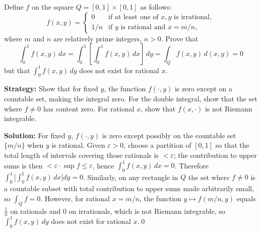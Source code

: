 \begin{problembox}
\begin{problemstatement}
Define \( f \) on the square \( Q = [0, 1] \times [0, 1] \) as follows:
\[f(x, y) = 
\begin{cases} 
0 & \text{if at least one of } x, y \text{ is irrational}, \\ 
1/n & \text{if } y \text{ is rational and } x = m/n,
\end{cases}\]
where \( m \) and \( n \) are relatively prime integers, \( n > 0 \). Prove that
\[\int_{0}^{1} f(x, y) \, dx = \int_{0}^{1} \left[ \int_{0}^{1} f(x, y) \, dx \right] \, dy = \int_{Q} f(x, y) \, d(x, y) = 0\]
but that \( \int_{0}^{1} f(x, y) \, dy \) does not exist for rational \( x \).
\end{problemstatement}
\end{problembox}

\noindent\textbf{Strategy:} Show that for fixed $y$, the function $f(\cdot,y)$ is zero except on a countable set, making the integral zero. For the double integral, show that the set where $f\neq 0$ has content zero. For rational $x$, show that $f(x,\cdot)$ is not Riemann integrable.

\bigskip\noindent\textbf{Solution:}
For fixed $y$, $f(\cdot,y)$ is zero except possibly on the countable set $\{m/n\}$ when $y$ is rational. Given $\varepsilon>0$, choose a partition of $[0,1]$ so that the total length of intervals covering those rationals is $<\varepsilon$; the contribution to upper sums is then $<\varepsilon\cdot\sup f\le \varepsilon$, hence $\int_0^1 f(x,y)\,dx=0$. Therefore $\int_0^1\!\Big[\int_0^1 f(x,y)\,dx\Big]dy=0$.
Similarly, on any rectangle in $Q$ the set where $f\ne 0$ is a countable subset with total contribution to upper sums made arbitrarily small, so $\int_Q f=0$. However, for rational $x=m/n$, the function $y\mapsto f(m/n,y)$ equals $\tfrac{1}{n}$ on rationals and $0$ on irrationals, which is not Riemann integrable, so $\int_0^1 f(x,y)\,dy$ does not exist for rational $x$.\qed


